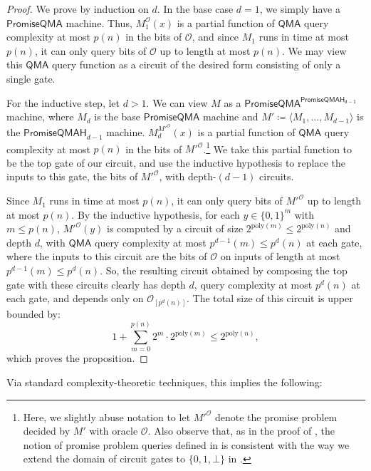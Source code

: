 \documentclass[10pt,a4paper]{article}
\newcommand{\poly}{\mathrm{poly}}
\begin{document}
\begin{proof}
We prove by induction on $d$. In the base case $d = 1$, we simply have a $\mathsf{PromiseQMA}$ machine. Thus, $M_1^\mathcal{O}(x)$ is a partial function of $\mathsf{QMA}$ query complexity at most $p(n)$ in the bits of $\mathcal{O}$, and since $M_1$ runs in time at most $p(n)$, it can only query bits of $\mathcal{O}$ up to length at most $p(n)$. We may view this $\mathsf{QMA}$ query function as a circuit of the desired form consisting of only a single gate.

For the inductive step, let $d > 1$. We can view $M$ as a $\mathsf{PromiseQMA}^\mathsf{PromiseQMAH_{d-1}}$ machine, where $M_d$ is the base $\mathsf{PromiseQMA}$ machine and $M' \coloneqq \langle M_1,\ldots,M_{d-1} \rangle$ is the $\mathsf{PromiseQMAH}_{d-1}$ machine. $M_d^{M'^{\mathcal{O}}}(x)$ is a partial function of $\mathsf{QMA}$ query complexity at most $p(n)$ in the bits of $M'^{\mathcal{O}}$.\footnote{Here, we slightly abuse notation to let $M'^{\mathcal{O}}$ denote the promise problem decided by $M'$ with oracle $\mathcal{O}$. Also observe that, as in the proof of , the notion of promise problem queries defined in  is consistent with the way we extend the domain of circuit gates to $\{0,1,\bot\}$ in .} We take this partial function to be the top gate of our circuit, and use the inductive hypothesis to replace the inputs to this gate, the bits of $M'^{\mathcal{O}}$, with depth-$(d-1)$ circuits.

Since $M_1$ runs in time at most $p(n)$, it can only query bits of $M'^{\mathcal{O}}$ up to length at most $p(n)$. By the inductive hypothesis, for each $y \in \{0,1\}^{m}$ with $m \le p(n)$, $M'^{\mathcal{O}}(y)$ is computed by a circuit of size $2^{\poly(m)} \le 2^{\poly(n)}$ and depth $d$, with $\mathsf{QMA}$ query complexity at most $p^{d-1}(m) \le p^d(n)$ at each gate, where the inputs to this circuit are the bits of $\mathcal{O}$ on inputs of length at most $p^{d-1}(m) \le p^d(n)$. So, the resulting circuit obtained by composing the top gate with these circuits clearly has depth $d$, query complexity at most $p^d(n)$ at each gate, and depends only on $\mathcal{O}_{[p^d(n)]}$. The total size of this circuit is upper bounded by:
\[
1 + \sum_{m=0}^{p(n)} 2^{m} \cdot 2^{\poly(m)} \le 2^{\poly(n)},
\]
which proves the proposition.
\end{proof}

Via standard complexity-theoretic techniques, this implies the following:
\end{document}
